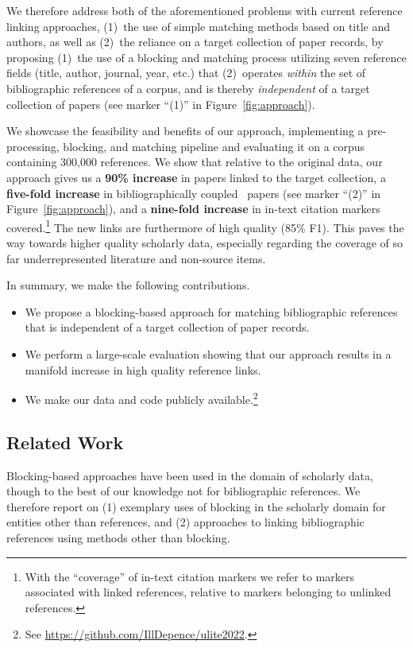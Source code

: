 We therefore address both of the aforementioned problems with current reference linking approaches, (1)~the use of simple matching methods based on title and authors, as well as (2)~the reliance on a target collection of paper records, by proposing (1)~the use of a blocking and matching process utilizing seven reference fields (title, author, journal, year, etc.) that (2)~operates \emph{within} the set of bibliographic references of a corpus, and is thereby \emph{independent} of a target collection of papers (see marker ``(1)'' in Figure~\ref{fig:approach}).

We showcase the feasibility and benefits of our approach, implementing a pre-processing, blocking, and matching pipeline and evaluating it on a corpus containing 300,000 references.
We show that relative to the original data, our approach gives us a \textbf{90\% increase} in papers linked to the target collection, a \textbf{five-fold increase} in bibliographically coupled~\cite{Boyack2010} papers (see marker ``(2)'' in Figure~\ref{fig:approach}), and a \textbf{nine-fold increase} in in-text citation markers covered.\footnote{With the ``coverage'' of in-text citation markers we refer to markers associated with linked references, relative to markers belonging to unlinked references.} The new links are furthermore of high quality (85\% F1). This paves the way towards higher quality scholarly data, especially regarding the coverage of so far underrepresented literature and non-source items.

In summary, we make the following contributions.

\begin{itemize}
    \item We propose a blocking-based approach for matching bibliographic references that is independent of a target collection of paper records.
    \item We perform a large-scale evaluation showing that our approach results in a manifold increase in high quality reference links.
    \item We make our data and code publicly available.\footnote{See \url{https://github.com/IllDepence/ulite2022}.}
\end{itemize}

\subsection{Related Work}
Blocking-based approaches have been used in the domain of scholarly data, though to the best of our knowledge not for bibliographic references. We therefore report on (1) exemplary uses of blocking in the scholarly domain for entities other than references, and (2) approaches to linking bibliographic references using methods other than blocking.

